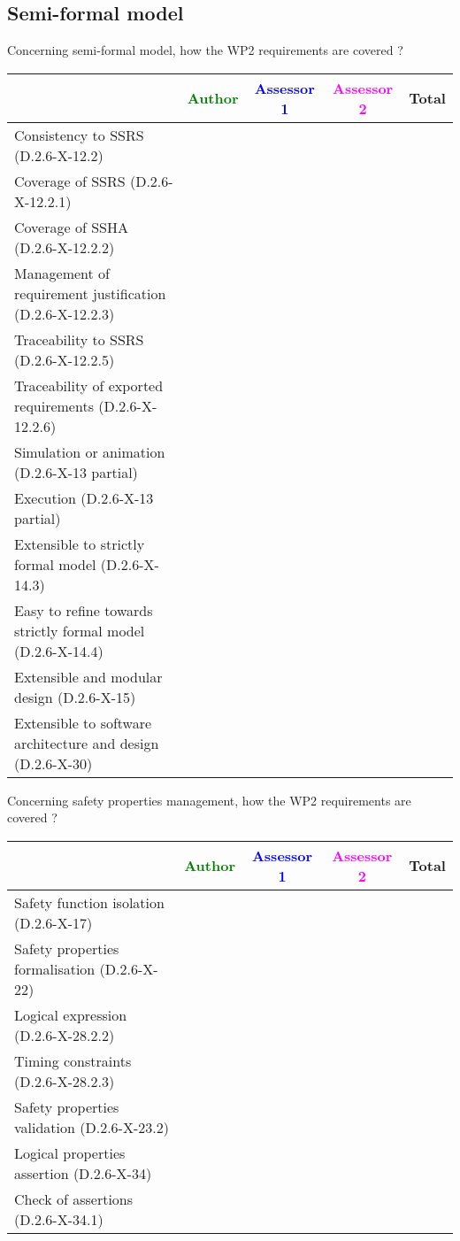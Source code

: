 \subsection{Semi-formal model}

Concerning semi-formal model, how the WP2 requirements are covered ?

\begin{tabular}{|l | c | c | c | c|}
\hline
& \textcolor{green}{Author} & \textcolor{blue}{Assessor 1} & \textcolor{magenta}{Assessor 2} & Total \\
\hline 
Consistency to SSRS (D.2.6-X-12.2) & & & &  \\
\hline
Coverage of SSRS (D.2.6-X-12.2.1)  & & & &  \\
\hline
Coverage of SSHA (D.2.6-X-12.2.2)  & & & &  \\
\hline
Management of requirement justification (D.2.6-X-12.2.3)  & & & &  \\
\hline
Traceability to  SSRS (D.2.6-X-12.2.5)  & & & &  \\
\hline
Traceability of exported requirements (D.2.6-X-12.2.6)  & & & &  \\
\hline
Simulation or animation (D.2.6-X-13 partial)  & & & &  \\
\hline
Execution (D.2.6-X-13 partial)  & & & &  \\
\hline
Extensible to strictly formal model (D.2.6-X-14.3) & & & &  \\
\hline
Easy to  refine towards strictly formal model (D.2.6-X-14.4) & & & &  \\
\hline
Extensible and modular design (D.2.6-X-15)  & & & &  \\
\hline
Extensible to software architecture and design (D.2.6-X-30)   & & & &  \\
\hline
\end{tabular}

Concerning safety properties management, how the WP2 requirements are covered ?

\begin{tabular}{|l | c | c | c | c|}
\hline
& \textcolor{green}{Author} & \textcolor{blue}{Assessor 1} & \textcolor{magenta}{Assessor 2} & Total \\
\hline 
Safety function isolation (D.2.6-X-17)  & & & &  \\
\hline 
Safety properties formalisation (D.2.6-X-22)  & & & &  \\
\hline
Logical expression (D.2.6-X-28.2.2)  & & & &  \\
\hline
Timing constraints (D.2.6-X-28.2.3)  & & & &  \\
\hline
Safety properties validation (D.2.6-X-23.2)  & & & &  \\
\hline
Logical properties assertion (D.2.6-X-34)  & & & &  \\
\hline
Check  of assertions (D.2.6-X-34.1)  & & & &  \\
\hline
\end{tabular}

